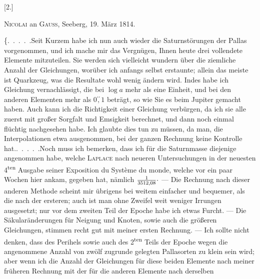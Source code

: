 \clearpage
\begingroup
{}
\renewcommand{\headrulewidth}{0pt}
\par\medskip
{}
\begin{center}
[2.]\par\medskip
\textsc{Nicolai} an \textsc{Gauss}, Seeberg, 19. März 1814.
\end{center}
\par\noindent\hspace*{\parindent}\{.\ .\ .\ .\ .\quad Seit Kurzem habe ich nun auch wieder die Saturnstörungen der
Pallas vorgenommen, und ich mache mir das Vergnügen, Ihnen heute drei
vollendete Elemente mitzuteilen. Sie werden sich vielleicht wundern über
die ziemliche Anzahl der Gleichungen, worüber ich anfangs selbst erstaunte;
allein das meiste ist Quarkzeug, was die Resultate wohl wenig ändern wird.
Indes habe ich  Gleichung vernachlässigt, die bei \(\log a\) mehr
als eine Einheit, und bei den anderen Elementen mehr als \(0\overset{\prime\prime}{,}1\) beträgt, so wie
Sie es beim Jupiter gemacht haben. Auch kann ich die Richtigkeit einer
 Gleichung verbürgen, da ich sie alle zuerst mit großer Sorgfalt und
Emsigkeit berechnet, und dann noch einmal flüchtig nachgesehen habe. Ich
glaubte dies tun zu müssen, da man, die Interpolationen etwa ausgenommen,
bei der ganzen Rechnung keine Kontrolle hat.\quad .\ .\ .\ .\ .\quad Noch muss ich bemerken,
dass ich für die Saturnmasse diejenige angenommen habe, welche
\textsc{Laplace} nach neueren Untersuchungen in der neuesten 4\textsuperscript{ten} Ausgabe seiner
Exposition du Système du monde, welche vor ein paar Wochen hier ankam, gegeben
hat, nämlich \(\frac{1}{3512{,}08}\mathpunct{\raisebox{.45ex}{.}}\) --- Die Rechnung nach dieser anderen Methode
scheint mir übrigens bei weitem einfacher und bequemer, als die nach der
ersteren; auch ist man ohne Zweifel weit weniger Irrungen ausgesetzt; nur
vor dem zweiten Teil der Epoche habe ich etwas Furcht. --- Die Säkularänderungen
für Neigung und Knoten, sowie auch die größeren Gleichungen,
stimmen recht gut mit meiner ersten Rechnung. --- Ich sollte nicht denken,
dass des Perihels sowie auch des 2\textsuperscript{ten} Teils der Epoche wegen die angenommene
Anzahl von zwölf zugrunde gelegten Pallasorten zu klein sein
wird; aber wenn ich die Anzahl der Gleichungen für diese beiden Elemente
nach meiner früheren Rechnung mit der für die anderen Elemente nach derselben
